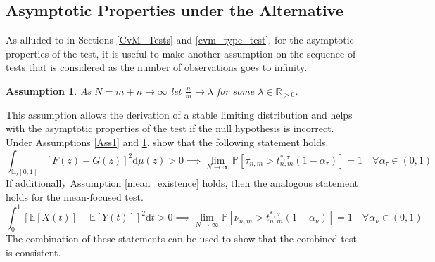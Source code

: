 \documentclass[12pt, a4paper]{article}
\theoremstyle{MAstyle} \newtheorem{assumption}{Assumption}[section]
\theoremstyle{MAstyle} \newtheorem{definition}{Definition}[section]
\theoremstyle{MAstyle} \newtheorem{theorem}{Theorem}[section]
\begin{document}
		\subsection{Asymptotic Properties under the Alternative}
			As alluded to in Sections \ref{CvM_Tests} and \ref{cvm_type_test}, for the asymptotic properties of the test, it is useful to make another assumption on the sequence of tests that is considered as the number of observations goes to infinity.
			\begin{assumption}\label{lambda}
				As $N = m + n \rightarrow \infty$ let $\frac{n}{m} \rightarrow \lambda$ for some $\lambda \in \mathbb{R}_{>0}$.
			\end{assumption} 
			This assumption allows the derivation of a stable limiting distribution and helps with the asymptotic properties of the test if the null hypothesis is incorrect.			
			Under Assumptions \ref{Ass1} and \ref{lambda}, \cite{bugni_permutation_2021} show that the following statement holds.
			\begin{equation}
				\int_{\mathbb{L}_2[0,1]} \left[F(z) - G(z)\right]^2 \mathrm{d} \mu(z) > 0 \implies \lim_{N \rightarrow \infty} \mathbb{P}\left[\tau_{n,m} > t^{*, \tau}_{n,m}(1-\alpha_{\tau})\right] = 1 \quad \forall \alpha_{\tau} \in (0,1)
			\end{equation}
			If additionally Assumption \ref{mean_existence} holds, then the analogous statement holds for the mean-focused test.
			\begin{equation}
				\int_{0}^{1} \left[\mathbb{E}\left[X(t)\right] - \mathbb{E}\left[Y(t)\right]\right]^2 \mathrm{d}t > 0 \implies \lim_{N \rightarrow \infty} \mathbb{P}\left[\nu_{n,m} > t^{*, \nu}_{n,m}(1-\alpha_{\nu})\right] = 1 \quad \forall \alpha_{\nu} \in (0,1)
			\end{equation}
			The combination of these statements can be used to show that the combined test is consistent.
			
\end{document}
